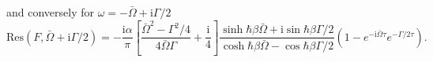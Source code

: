 %
and conversely for $\omega=-\bar{\Omega}+\text{i}\Gamma/2$
%
\begin{equation}
    \text{Res}(F,\bar{\Omega}+\text{i}\Gamma/2)=-\frac{\text{i}\alpha}{\pi}
    \left[ \frac{\bar{\Omega}^2-\Gamma^2/4}{4\bar{\Omega}\Gamma}+\frac{\text{i}}{4} \right]
    \frac{\sinh\hbar\beta\bar{\Omega}+\text{i}\sin\hbar\beta\Gamma/2}{\cosh\hbar\beta\bar{\Omega}-\cos\hbar\beta\Gamma/2}
    (1-e^{-\text{i}\bar{\Omega}\tau}e^{-\Gamma/2\tau}).
\end{equation}
%